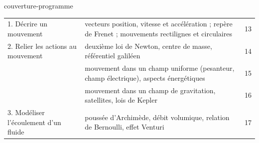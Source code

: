 \begin{blocEdition}{couverture-programme}
{\begin{tabularx}{\linewidth}{@{}p{50mm}Yr@{}}
1. Décrire un mouvement & vecteurs position, vitesse et accélération ; repère de Frenet ; mouvements rectilignes et
circulaires & 13 \\
2. Relier les actions au mouvement & deuxième loi de Newton, centre de masse, référentiel galiléen & 14 \\
& mouvement dans un champ uniforme (pesanteur, champ électrique), aspects énergétiques & 15 \\
& mouvement dans un champ de gravitation, satellites, lois de Kepler & 16 \\
3. Modéliser l'écoulement d'un fluide & poussée d'Archimède, débit volumique, relation de Bernoulli, effet Venturi & 17 \\\bottomrule
\end{tabularx}}
\end{blocEdition}

